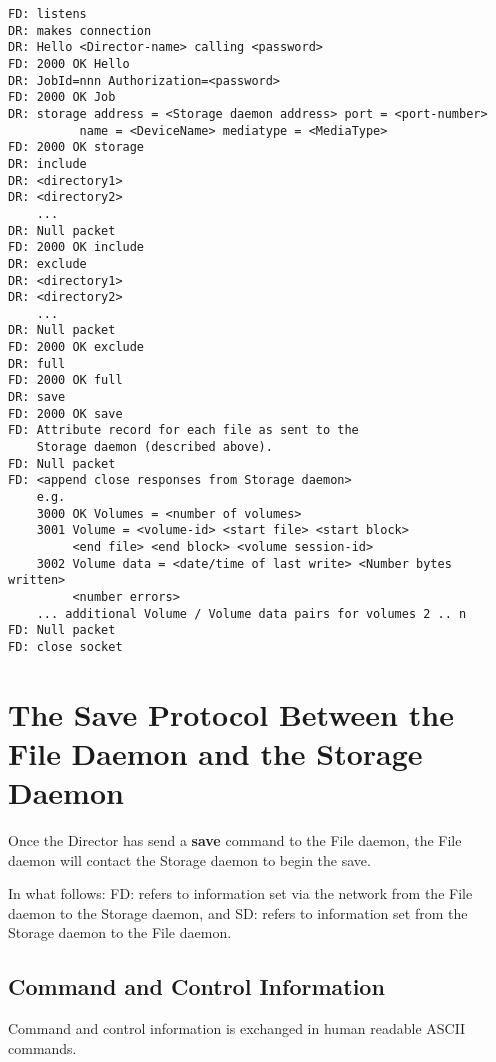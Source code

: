 \footnotesize
\begin{verbatim}
FD: listens
DR: makes connection
DR: Hello <Director-name> calling <password>
FD: 2000 OK Hello
DR: JobId=nnn Authorization=<password>
FD: 2000 OK Job
DR: storage address = <Storage daemon address> port = <port-number>
          name = <DeviceName> mediatype = <MediaType>
FD: 2000 OK storage
DR: include
DR: <directory1>
DR: <directory2>
    ...
DR: Null packet
FD: 2000 OK include
DR: exclude
DR: <directory1>
DR: <directory2>
    ...
DR: Null packet
FD: 2000 OK exclude
DR: full
FD: 2000 OK full
DR: save
FD: 2000 OK save
FD: Attribute record for each file as sent to the
    Storage daemon (described above).
FD: Null packet
FD: <append close responses from Storage daemon>
    e.g.
    3000 OK Volumes = <number of volumes>
    3001 Volume = <volume-id> <start file> <start block>
         <end file> <end block> <volume session-id>
    3002 Volume data = <date/time of last write> <Number bytes written>
         <number errors>
    ... additional Volume / Volume data pairs for volumes 2 .. n
FD: Null packet
FD: close socket
\end{verbatim}
\normalsize

\section{The Save Protocol Between the File Daemon and the Storage Daemon}

Once the Director has send a {\bf save} command to the File daemon, the File
daemon will contact the Storage daemon to begin the save. 

In what follows: FD: refers to information set via the network from the File
daemon to the Storage daemon, and SD: refers to information set from the
Storage daemon to the File daemon. 

\subsection{Command and Control Information}

Command and control information is exchanged in human readable ASCII commands.


